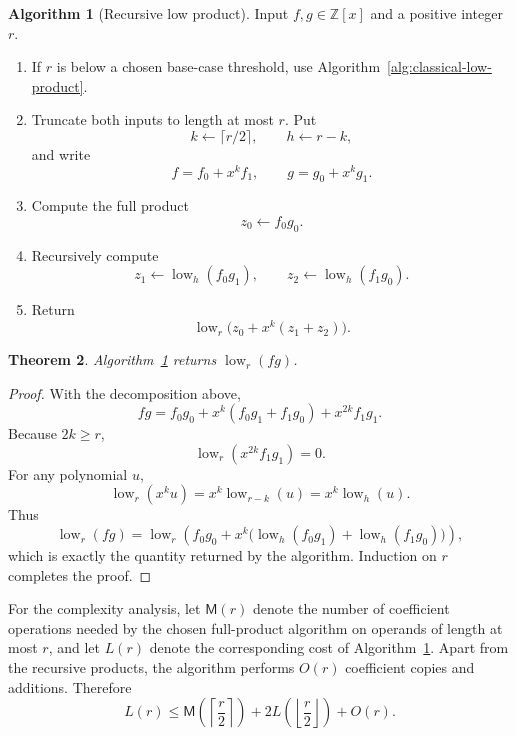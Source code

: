 \documentclass[11pt]{book}
\newtheorem{theorem}{Theorem}[section]
\theoremstyle{definition}
\newtheorem{algorithm}[theorem]{Algorithm}
\newcommand{\ZZ}{\mathbb Z}
\begin{document}
\begin{algorithm}[Recursive low product]\label{alg:recursive-low-product}
Input $f,g\in\ZZ[x]$ and a positive integer $r$.
\begin{enumerate}
 \item If $r$ is below a chosen base-case threshold, use
 Algorithm~\ref{alg:classical-low-product}.
 \item Truncate both inputs to length at most $r$.  Put
 \[
 k\leftarrow\lceil r/2\rceil,
 \qquad h\leftarrow r-k,
 \]
 and write
 \[
 f=f_0+x^kf_1,
 \qquad g=g_0+x^kg_1.
 \]
 \item Compute the full product
 \[
 z_0\leftarrow f_0g_0.
 \]
 \item Recursively compute
 \[
 z_1\leftarrow\operatorname{low}_h(f_0g_1),
 \qquad
 z_2\leftarrow\operatorname{low}_h(f_1g_0).
 \]
 \item Return
 \[
 \operatorname{low}_r\bigl(z_0+x^k(z_1+z_2)\bigr).
 \]
\end{enumerate}
\end{algorithm}

\begin{theorem}\label{thm:recursive-low-correctness}
Algorithm~\ref{alg:recursive-low-product} returns
$\operatorname{low}_r(fg)$.
\end{theorem}

\begin{proof}
With the decomposition above,
\[
 fg=f_0g_0+x^k(f_0g_1+f_1g_0)+x^{2k}f_1g_1.
\]
Because $2k\geq r$,
\[
 \operatorname{low}_r(x^{2k}f_1g_1)=0.
\]
For any polynomial $u$,
\[
 \operatorname{low}_r(x^ku)
 =x^k\operatorname{low}_{r-k}(u)
 =x^k\operatorname{low}_h(u).
\]
Thus
\[
 \operatorname{low}_r(fg)
 =\operatorname{low}_r\!\left(
 f_0g_0+x^k\bigl(
 \operatorname{low}_h(f_0g_1)
 +\operatorname{low}_h(f_1g_0)
 \bigr)\right),
\]
which is exactly the quantity returned by the algorithm.  Induction on $r$
completes the proof.
\end{proof}

For the complexity analysis, let $\mathsf M(r)$ denote the number of
coefficient operations needed by the chosen full-product algorithm on operands
of length at most $r$, and let $L(r)$ denote the corresponding cost of
Algorithm~\ref{alg:recursive-low-product}.  Apart from the recursive products,
the algorithm performs $O(r)$ coefficient copies and additions.  Therefore
\begin{equation}\label{eq:low-product-recurrence}
 L(r)\leq
 \mathsf M\!\left(\left\lceil\frac r2\right\rceil\right)
 +2L\!\left(\left\lfloor\frac r2\right\rfloor\right)
 +O(r).
\end{equation}
\end{document}
